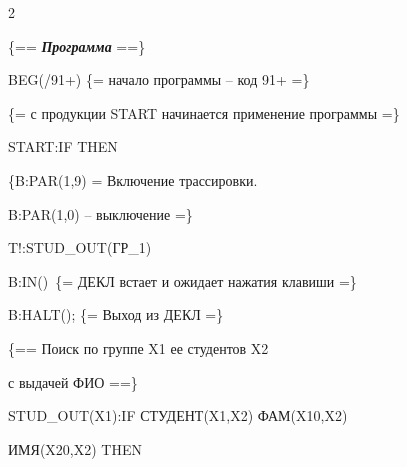 \begin{multicols}{2}
{\noindent


 \{== {\bfseries\textit{Программа}} ==\}





\noindent


 BEG(/91+) \{= начало программы -- код 91+ =\}





\noindent


 \{= с продукции START начинается применение программы =\}





\noindent


 START:IF THEN





\noindent


 \{B:PAR(1,9) = Включение трассировки.





  B:PAR(1,0) -- выключение =\}





\noindent


 T!:STUD\_OUT(ГР\_1)





\noindent


 B:IN()\ \{= ДЕКЛ встает и ожидает нажатия клавиши =\}





\noindent


 B:HALT(); \{= Выход из ДЕКЛ =\}





\noindent


 \{== Поиск по группе X1 ее студентов X2





  с выдачей ФИО ==\}





\noindent


 STUD\_OUT(X1):IF СТУДЕНТ(X1,X2) ФАМ(X10,X2)





  ИМЯ(X20,X2) THEN





}
\end{multicols}
